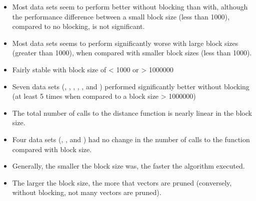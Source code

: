 \begin{itemize}
    \item Most data sets seem to perform better without blocking than with,
        although the performance difference between a small block size (less
        than 1000), compared to no blocking, is not significant.
    \item Most data sets seems to perform significantly worse with large block
        sizes (greater than 1000), when compared with smaller block sizes (less
        than 1000).
    \item Fairly stable with block size of < 1000 or > 1000000
    \item Seven data sets (, ,
        , , , 
        and ) performed significantly better without
        blocking (at least 5 times when compared to a block size > 1000000)
    \item The total number of calls to the distance function is nearly linear in
        the block size.
    \item Four data sets (, ,
         and ) had no change in the number
        of calls to the  function compared with block
        size.
    \item Generally, the smaller the block size was, the faster the algorithm
        executed.
    \item The larger the block size, the more that vectors are pruned
        (conversely, without blocking, not many vectors are pruned).
\end{itemize}

